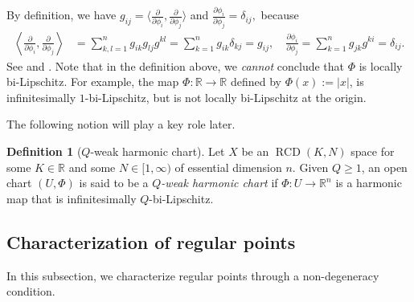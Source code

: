 \documentclass[11pt,reqno]{amsart}
\theoremstyle{definition}
\newtheorem{definition}[theorem]{Definition}
\numberwithin{equation}{section}
\newcommand{\dR}{\mathbb{R}}
\DeclareMathOperator{\RCD}{RCD}
\begin{document}
By definition, we have $g_{ij}=\langle \frac{\partial}{\partial \phi_i}, \frac{\partial}{\partial \phi_j}\rangle$ and $ 
\frac{\partial \phi_i}{\partial \phi_j}=\delta_{ij},$ 
because
\begin{align}\label{saihsaoihsrohsoaihs}
\left\langle \frac{\partial}{\partial \phi_i}, \frac{\partial}{\partial \phi_j}\right\rangle &= \sum_{k, l=1}^ng_{i k}g_{l j}g^{k l} =\sum_{k=1}^n g_{i k}\delta_{kj}=g_{i j}, \quad \frac{\partial \phi_i}{\partial \phi_j}=\sum_{k=1}^ng_{jk}g^{ki}=\delta_{ij}.
\end{align}
See \cite[Section 3]{Honda1} and \cite{Gigli1}. Note that
    in the definition above, 
    we \textit{cannot} conclude that $\Phi$ is   locally bi-Lipschitz. For example, the map  $\Phi:\mathbb{R} \to \mathbb{R}$ defined by $\Phi(x):=|x|$, is infinitesimally $1$-bi-Lipschitz, but is not locally bi-Lipschitz at the origin. 

The following notion will play a key role later. 
\begin{definition}[$Q$-weak harmonic chart]\label{d:Q-weak} 
Let $X$ be an $\RCD(K, N)$ space for some $K \in \mathbb{R}$ and some $N  \in [1, \infty)$ of essential dimension $n$. Given $Q \geq 1$, an open chart $(U , \Phi)$ is said to be a \textit{$Q$-weak harmonic chart} if $\Phi: U \to \dR^n$ is a harmonic map that is infinitesimally $Q$-bi-Lipschitz. 
\end{definition}

\subsection{Characterization of regular points}
In this subsection, we characterize regular points through a non-degeneracy condition. 
\end{document}

